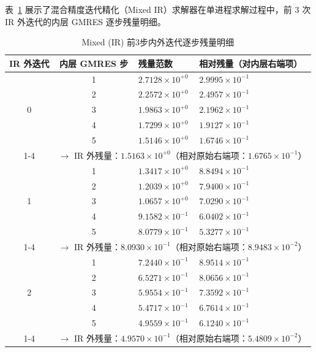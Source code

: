 \documentclass[12pt,a4paper]{article}
\begin{document}
表~\ref{tab:ir_inner_detail} 展示了混合精度迭代精化（Mixed IR）求解器在单进程求解过程中，前 3 次 IR 外迭代的内层 GMRES 逐步残量明细。
\begin{table}[htpb]
    \centering
    \caption{Mixed (IR) 前3步内外迭代逐步残量明细}
    \label{tab:ir_inner_detail}
    \begin{tabular}{ccll}
    \toprule
    IR 外迭代 & 内层 GMRES 步 & 残量范数 & 相对残量（对内层右端项） \\
    \midrule
    \multirow{5}{*}{0}
     & 1 & $2.7128\times10^{+0}$ & $2.9995\times10^{-1}$ \\
     & 2 & $2.2572\times10^{+0}$ & $2.4957\times10^{-1}$ \\
     & 3 & $1.9863\times10^{+0}$ & $2.1962\times10^{-1}$ \\
     & 4 & $1.7299\times10^{+0}$ & $1.9127\times10^{-1}$ \\
     & 5 & $1.5146\times10^{+0}$ & $1.6746\times10^{-1}$ \\
    \cmidrule(lr){1-4}
     & \multicolumn{3}{l}{$\rightarrow$ IR 外残量：$1.5163\times10^{+0}$（相对原始右端项：$1.6765\times10^{-1}$）} \\
    \midrule
    \multirow{5}{*}{1}
     & 1 & $1.3417\times10^{+0}$ & $8.8494\times10^{-1}$ \\
     & 2 & $1.2039\times10^{+0}$ & $7.9400\times10^{-1}$ \\
     & 3 & $1.0657\times10^{+0}$ & $7.0290\times10^{-1}$ \\
     & 4 & $9.1582\times10^{-1}$ & $6.0402\times10^{-1}$ \\
     & 5 & $8.0779\times10^{-1}$ & $5.3277\times10^{-1}$ \\
    \cmidrule(lr){1-4}
     & \multicolumn{3}{l}{$\rightarrow$ IR 外残量：$8.0930\times10^{-1}$（相对原始右端项：$8.9483\times10^{-2}$）} \\
    \midrule
    \multirow{5}{*}{2}
     & 1 & $7.2440\times10^{-1}$ & $8.9514\times10^{-1}$ \\
     & 2 & $6.5271\times10^{-1}$ & $8.0656\times10^{-1}$ \\
     & 3 & $5.9554\times10^{-1}$ & $7.3592\times10^{-1}$ \\
     & 4 & $5.4717\times10^{-1}$ & $6.7614\times10^{-1}$ \\
     & 5 & $4.9559\times10^{-1}$ & $6.1240\times10^{-1}$ \\
    \cmidrule(lr){1-4}
     & \multicolumn{3}{l}{$\rightarrow$ IR 外残量：$4.9570\times10^{-1}$（相对原始右端项：$5.4809\times10^{-2}$）} \\
    \bottomrule
    \end{tabular}
    \end{table}
    
\end{document}
